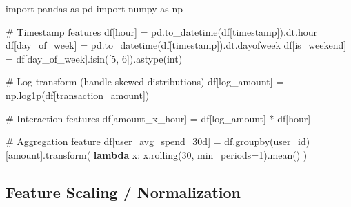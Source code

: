\documentclass[11pt]{article}
\newenvironment{Shaded}{\begin{snugshade}}{\end{snugshade}}
\newcommand{\BuiltInTok}[1]{\textcolor[rgb]{0.50,0.55,0.55}{#1}}
\newcommand{\CommentTok}[1]{\textcolor[rgb]{0.48,0.49,0.49}{#1}}
\newcommand{\DecValTok}[1]{\textcolor[rgb]{0.96,0.45,0.00}{#1}}
\newcommand{\ImportTok}[1]{\textcolor[rgb]{0.15,0.68,0.38}{#1}}
\newcommand{\KeywordTok}[1]{\textcolor[rgb]{0.81,0.81,0.76}{\textbf{#1}}}
\newcommand{\NormalTok}[1]{\textcolor[rgb]{0.81,0.81,0.76}{#1}}
\newcommand{\OperatorTok}[1]{\textcolor[rgb]{0.81,0.81,0.76}{#1}}
\newcommand{\StringTok}[1]{\textcolor[rgb]{0.96,0.31,0.31}{#1}}
\begin{document}
\begin{Shaded}
\begin{Highlighting}[]
\ImportTok{import}\NormalTok{ pandas }\ImportTok{as}\NormalTok{ pd}
\ImportTok{import}\NormalTok{ numpy }\ImportTok{as}\NormalTok{ np}

\CommentTok{\# Timestamp features}
\NormalTok{df[}\StringTok{\textquotesingle{}hour\textquotesingle{}}\NormalTok{] }\OperatorTok{=}\NormalTok{ pd.to\_datetime(df[}\StringTok{\textquotesingle{}timestamp\textquotesingle{}}\NormalTok{]).dt.hour}
\NormalTok{df[}\StringTok{\textquotesingle{}day\_of\_week\textquotesingle{}}\NormalTok{] }\OperatorTok{=}\NormalTok{ pd.to\_datetime(df[}\StringTok{\textquotesingle{}timestamp\textquotesingle{}}\NormalTok{]).dt.dayofweek}
\NormalTok{df[}\StringTok{\textquotesingle{}is\_weekend\textquotesingle{}}\NormalTok{] }\OperatorTok{=}\NormalTok{ df[}\StringTok{\textquotesingle{}day\_of\_week\textquotesingle{}}\NormalTok{].isin([}\DecValTok{5}\NormalTok{, }\DecValTok{6}\NormalTok{]).astype(}\BuiltInTok{int}\NormalTok{)}

\CommentTok{\# Log transform (handle skewed distributions)}
\NormalTok{df[}\StringTok{\textquotesingle{}log\_amount\textquotesingle{}}\NormalTok{] }\OperatorTok{=}\NormalTok{ np.log1p(df[}\StringTok{\textquotesingle{}transaction\_amount\textquotesingle{}}\NormalTok{])}

\CommentTok{\# Interaction features}
\NormalTok{df[}\StringTok{\textquotesingle{}amount\_x\_hour\textquotesingle{}}\NormalTok{] }\OperatorTok{=}\NormalTok{ df[}\StringTok{\textquotesingle{}log\_amount\textquotesingle{}}\NormalTok{] }\OperatorTok{*}\NormalTok{ df[}\StringTok{\textquotesingle{}hour\textquotesingle{}}\NormalTok{]}

\CommentTok{\# Aggregation feature}
\NormalTok{df[}\StringTok{\textquotesingle{}user\_avg\_spend\_30d\textquotesingle{}}\NormalTok{] }\OperatorTok{=}\NormalTok{ df.groupby(}\StringTok{\textquotesingle{}user\_id\textquotesingle{}}\NormalTok{)[}\StringTok{\textquotesingle{}amount\textquotesingle{}}\NormalTok{].transform(}
    \KeywordTok{lambda}\NormalTok{ x: x.rolling(}\DecValTok{30}\NormalTok{, min\_periods}\OperatorTok{=}\DecValTok{1}\NormalTok{).mean()}
\NormalTok{)}
\end{Highlighting}
\end{Shaded}

\subsection{Feature Scaling / Normalization}\label{feature-scaling--normalization}
\end{document}
